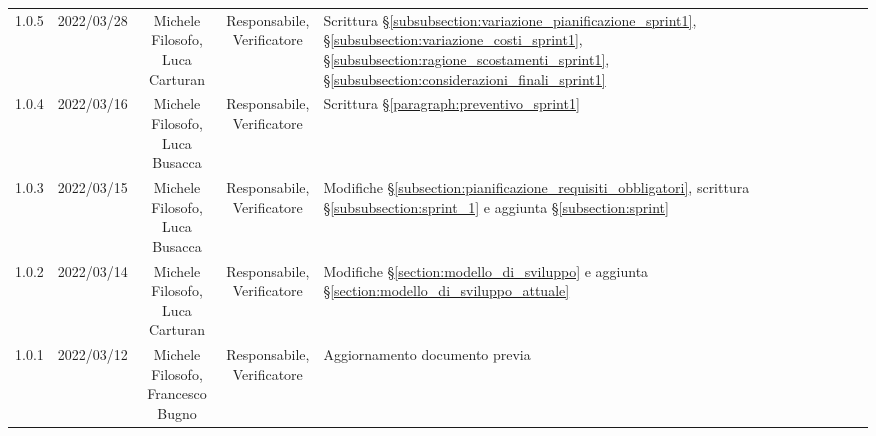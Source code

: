 \begin{center}
\begin{longtable}[c]{c | c | c | c | p{5cm}}
		1.0.5                                                      & 2022/03/28 & \Shortunderstack{Michele Filosofo,                                                                                                                                                                  \\Luca Carturan} & \Shortunderstack{Responsabile,\\Verificatore} & Scrittura §\ref{subsubsection:variazione_pianificazione_sprint1}, §\ref{subsubsection:variazione_costi_sprint1}, §\ref{subsubsection:ragione_scostamenti_sprint1}, §\ref{subsubsection:considerazioni_finali_sprint1}\\
		1.0.4                                                      & 2022/03/16 & \Shortunderstack{Michele Filosofo,                                                                                                                                                                  \\Luca Busacca} & \Shortunderstack{Responsabile,\\Verificatore} & Scrittura §\ref{paragraph:preventivo_sprint1}\\
		1.0.3                                                      & 2022/03/15 & \Shortunderstack{Michele Filosofo,                                                                                                                                                                  \\Luca Busacca} & \Shortunderstack{Responsabile,\\Verificatore} & Modifiche §\ref{subsection:pianificazione_requisiti_obbligatori}, scrittura §\ref{subsubsection:sprint_1}  e aggiunta §\ref{subsection:sprint}\\
		1.0.2                                                      & 2022/03/14 & \Shortunderstack{Michele Filosofo,                                                                                                                                                                  \\Luca Carturan} & \Shortunderstack{Responsabile,\\Verificatore} & Modifiche §\ref{section:modello_di_sviluppo} e aggiunta §\ref{section:modello_di_sviluppo_attuale}\\
		1.0.1                                                      & 2022/03/12 & \Shortunderstack{Michele Filosofo,                                                                                                                                                                  \\Francesco Bugno} & \Shortunderstack{Responsabile,\\Verificatore} & Aggiornamento documento previa \RTB{} \\

\end{longtable}
\end{center}
